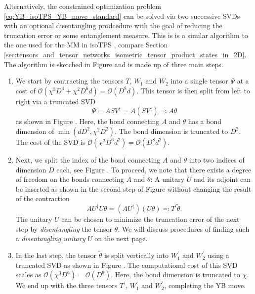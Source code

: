 Alternatively, the constrained optimization problem \eqref{eq:YB_isoTPS_YB_move_standard} can be solved via two successive SVDs with an optional disentangling prodcedure with the goal of reducing the truncation error or some entanglement measure. This is is a similar algorithm to the one used for the MM in isoTPS \cite{cite:isometric_tensor_network_states_in_two_dimensions, cite:efficient_simulation_of_dynamics_in_two_dimensional_quantum_spin_systems}, compare Section \ref{sec:tensors_and_tensor_networks_isometric_tensor_product_states_in_2D}. The algorithm is sketched in Figure  and is made up of three main steps.
\begin{enumerate}
	\item We start by contracting the tensors $T$, $W_1$ and $W_2$ into a single tensor $\Psi$ at a cost of $\mathcal{O}(\chi^3D^4+\chi^2D^6d) = \mathcal{O}(D^8d)$. This tensor is then split from left to right via a truncated SVD
	\begin{equation}
		\Psi = ASV^\dagger = A(SV^\dagger) \eqqcolon A\theta
	\end{equation}
	as shown in Figure . Here, the bond connecting $A$ and $\theta$ has a bond dimension of $\min(dD^2, \chi^2D^2)$. The bond dimension is truncated to $D^2$. The cost of the SVD is $\mathcal{O}(\chi^2D^6d^2) = \mathcal{O}(D^8d^2)$.
	\item Next, we split the index of the bond connecting $A$ and $\theta$ into two indices of dimension $D$ each, see Figure . To proceed, we note that there exists a degree of freedom on the bonds connecting $A$ and $\theta$: A unitary $U$ and its adjoint can be inserted as shown in the second step of Figure  without changing the result of the contraction
	\begin{equation}
		AU^\dagger U\theta = (AU^\dagger)(U\theta) \eqqcolon T^\prime \tilde{\theta}.
	\end{equation}
	The unitary $U$ can be chosen to minimize the truncation error of the next step by \textit{disentangling} the tensor $\theta$. We will discuss procedures of finding such a \textit{disentangling unitary} $U$ on the next page.
	\item In the last step, the tensor $\tilde{\theta}$ is split vertically into $W_1^\prime$ and $W_2^\prime$ using a truncated SVD as shown in Figure . The computational cost of this SVD scales as $\mathcal{O}(\chi^3D^6) = \mathcal{O}(D^9)$. Here, the bond dimension is truncated to $\chi$. We end up with the three tensors $T^\prime$, $W_1^\prime$ and $W_2^\prime$, completing the YB move.
\end{enumerate}
